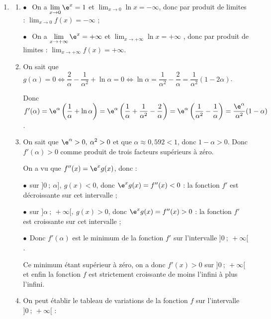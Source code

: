 \begin{enumerate}
\begin{enumerate}
Sur l'intervalle $[\alpha~;~+ \infty[$ la dérivée seconde est positive : la fonction $f$ est convexe sur cet intervalle.
	\end{enumerate}
\item
	\begin{enumerate}
		\item %
$\bullet~~$ On a $\displaystyle\lim_{x \to 0} \e^x = 1$ et $\displaystyle\lim_{x \to 0}\ln x = - \infty$, donc par produit de limites : $\displaystyle\lim_{x \to 0}f(x) = - \infty$ ;

$\bullet~~$ On a $\displaystyle\lim_{x \to + \infty} \e^x = + \infty$ et $\displaystyle\lim_{x \to + \infty} \ln x = + \infty$ , donc par produit de limites : $\displaystyle\lim_{x \to + \infty}f(x) = + \infty$.
		\item %

On sait que $g(\alpha) = 0 \iff \dfrac{2}{\alpha} - \dfrac{1}{\alpha^2} + \ln \alpha = 0 \iff \ln \alpha  = \dfrac{1}{\alpha^2} - \dfrac{2}{\alpha} = \dfrac{1}{\alpha^2}(1 - 2\alpha)$.

Donc $f'(\alpha) = \e^{\alpha}\left(\dfrac{1}{\alpha} + \ln \alpha \right) = \e^{\alpha}\left(\dfrac{1}{\alpha} +\dfrac{1}{\alpha^2} - \dfrac{2}{\alpha}\right) = \e^{\alpha}\left(\dfrac{1}{\alpha^2} - \dfrac{1}{\alpha}\right) = \dfrac{\e^{\alpha}}{\alpha^2}(1 - \alpha)$.
		\item %
On sait que $\e^{\alpha} > 0, \: \alpha^2 > 0$ et que $\alpha \approx 0,592 < 1$, donc $1 - \alpha > 0$. Donc $f'(\alpha) > 0$ comme produit de trois facteurs supérieurs à zéro.

On a vu que $f''(x) = \e^x g(x)$, donc :

$\bullet~~$sur $]0~;~\alpha], \: g(x) < 0$, donc $\e^x g(x) = f''(x) < 0$ : la fonction $f'$ est décroissante sur cet intervalle ;

$\bullet~~$sur $]\alpha~;~+\infty[, \: g(x) > 0$, donc $\e^x g(x) = f''(x) > 0$ : la fonction $f'$ est croissante sur cet intervalle ;

$\bullet~~$Donc $f'(\alpha)$ est le minimum de la fonction $f'$ sur l'intervalle $]0~;~+ \infty[$.

Ce minimum étant supérieur à zéro, on a donc $f'(x) > 0$ sur $]0~;~+ \infty[$ et enfin la fonction $f$ est strictement croissante de moins l'infini à plus l'infini.
		\item %
On peut établir le tableau de variations de la fonction $f$ sur l'intervalle $]0~;~+ \infty[$ :


\end{enumerate}
\end{enumerate}
